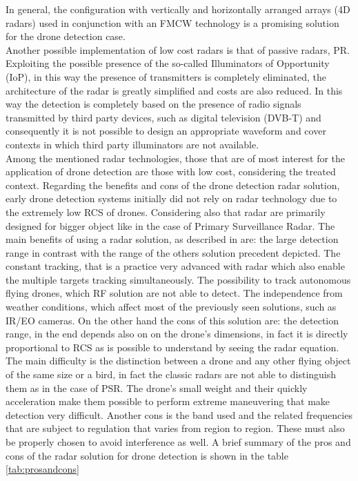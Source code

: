 In general, the configuration with vertically and horizontally arranged arrays (4D radars) used in conjunction with an FMCW technology is a promising solution for the drone detection case. \\ Another possible implementation of low cost radars is that of passive radars, PR. Exploiting the possible presence of the so-called Illuminators of Opportunity (IoP), in this way the presence of transmitters is completely eliminated, the architecture of the radar is greatly simplified and costs are also reduced. In this way the detection is completely based on the presence of radio signals transmitted by third party devices, such as digital television (DVB-T) and consequently it is not possible to design an appropriate waveform and cover contexts in which third party illuminators are not available.\\
Among the mentioned radar technologies, those that are of most interest for the application of drone detection are those with low cost, considering the treated context. Regarding the benefits and cons of the drone detection radar solution, early drone detection systems initially did not rely on radar technology due to the extremely low RCS of drones. Considering also that radar are primarily designed for bigger object like in the case of Primary Surveillance Radar. The main benefits of using a radar solution, as described in \cite{robinradar} are:
the large detection range in contrast with the range of the others solution precedent depicted. The constant tracking, that is a practice very advanced with radar which also enable the multiple targets tracking simultaneously. The possibility to track autonomous flying drones, which RF solution are not able to detect. The independence from weather conditions, which affect most of the previously seen solutions, such as IR/EO cameras. On the other hand the cons of this solution are: the detection range, in the end depends also on on the drone's dimensions, in fact it is directly proportional to RCS as is possible to understand by seeing the radar equation. The main difficulty is the distinction between a drone and any other flying object of the same size or a bird, in fact the classic radars are not able to distinguish them as in the case of PSR. The drone's small weight and their quickly acceleration make them possible to perform extreme maneuvering that make detection very difficult. Another cons is the band used and the related frequencies that are subject to regulation that varies from region to region. These must also be properly chosen to avoid interference as well. A brief summary of the pros and cons of the radar solution for drone detection is shown in the table \ref{tab:prosandcons}\\
